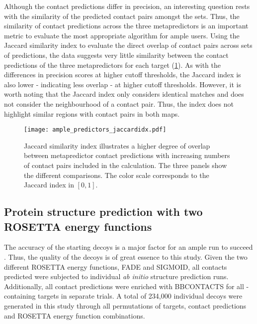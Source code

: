 Although the contact predictions differ in precision, an interesting question rests with the similarity of the predicted contact pairs amongst the sets. Thus, the similarity of contact predictions across the three metapredictors is an important metric to evaluate the most appropriate algorithm for \gls{ample} users. Using the Jaccard similarity index to evaluate the direct overlap of contact pairs across sets of predictions, the data suggests very little similarity between the contact predictions of the three metapredictors for each target (\cref{fig:ample_predictors_jaccardidx}). As with the differences in precision scores at higher cutoff thresholds, the Jaccard index is also lower - indicating less overlap - at higher cutoff thresholds. However, it is worth noting that the Jaccard index only considers identical matches and does not consider the neighbourhood of a contact pair. Thus, the index does not highlight similar regions with contact pairs in both maps.

\begin{figure}[H]
    \centering
    \texttt{[image: ample\_predictors\_jaccardidx.pdf]}
    \caption{Jaccard similarity index illustrates a higher degree of overlap between metapredictor contact predictions with increasing numbers of contact pairs included in the calculation. The three panels show the different comparisons. The color scale corresponds to the Jaccard index in $[0, 1]$.}
    \label{fig:ample_predictors_jaccardidx}
\end{figure}

\subsection{Protein structure prediction with two ROSETTA energy functions}
The accuracy of the starting decoys is a major factor for an \gls{ample} run to succeed \cite{Simkovic2016-jx, Thomas2017-lq}. Thus, the quality of the decoys is of great essence to this study. Given the two different ROSETTA energy functions, FADE and SIGMOID, all contacts predicted were subjected to individual \textit{ab initio} structure prediction runs. Additionally, all contact predictions were enriched with BBCONTACTS for all \textbeta-containing targets in separate trials. A total of 234,000 individual decoys were generated in this study through all permutations of targets, contact predictions and ROSETTA energy function combinations.

